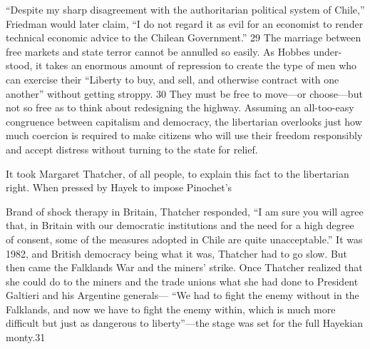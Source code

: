  \par 
“Despite my sharp disagreement with the authoritarian political system of Chile,” Friedman would later claim, “I do not regard it as evil for an economist to render technical economic advice to the Chilean Government.” {\color{blue}29} The marriage between free markets and state terror cannot be annulled so easily. As Hobbes under-stood, it takes an enormous amount of repression to create the type of men who can exercise their “Liberty to buy, and sell, and otherwise contract with one another” without getting stroppy. {\color{blue}30} They must be free to move—or choose—but not so free as to think about redesigning the highway. Assuming an all-too-easy congruence between capitalism and democracy, the libertarian overlooks just how much coercion is required to make citizens who will use their freedom responsibly and accept distress without turning to the state for relief.
 \par 
It took Margaret Thatcher, of all people, to explain this fact to the libertarian right. When pressed by Hayek to impose Pinochet’s
 \par 
Brand of shock therapy in Britain, Thatcher responded, “I am sure you will agree that, in Britain with our democratic institutions and the need for a high degree of consent, some of the measures adopted in Chile are quite unacceptable.” It was 1982, and British democracy being what it was, Thatcher had to go slow. But then came the Falklands War and the miners’ strike. Once Thatcher realized that she could do to the miners and the trade unions what she had done to President Galtieri and his Argentine generals— “We had to fight the enemy without in the Falklands, and now we have to fight the enemy within, which is much more difficult but just as dangerous to liberty”—the stage was set for the full Hayekian monty.{\color{blue}31}